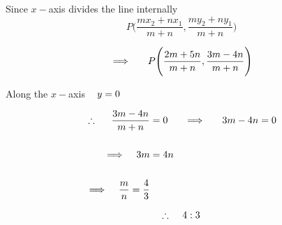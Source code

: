 \documentclass[11pt,a4paper]{article}
\begin{document}
\begin{figure}[H]
\centering
{}
\end{figure}
















Since $x-$axis divides the line internally 
$$P\Bigg(\dfrac{mx_2 + nx_1}{m + n}, \dfrac{my_2 + ny_1}{m + n}\Bigg)$$

$$\implies \hspace{0.5cm} P\Bigg(\dfrac{2m + 5n}{m + n}, \dfrac{3m - 4n}{m + n}\Bigg)$$



Along the $x-$axis $\hspace{0.3cm} y = 0$

\begin{align*}
\therefore\hspace{0.5cm} \dfrac{3m - 4n}{m + n} & = 0 \hspace{0.5cm}\implies \hspace{0.5cm} 3m - 4n = 0\\\\
\implies \hspace{0.3cm} 3m & = 4n\\\\
\implies \hspace{0.3cm} \dfrac{m}{n}= \dfrac{4}{3}
\end{align*}


$$\therefore\hspace{0.4cm} 4: 3$$\\\\
\end{document}
